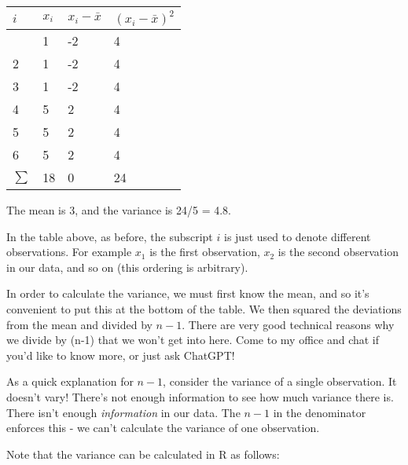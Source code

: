 \documentclass[
  letterpaper,
  DIV=11,
  numbers=noendperiod]{scrreprt}
\begin{document}
\begin{longtable}[]{@{}llll@{}}
\toprule\noalign{}
\(i\) & \(x_i\) & \(x_i - \bar x\) & \((x_i - \bar x)^2\) \\
\midrule\noalign{}
\endhead
\bottomrule\noalign{}
\endlastfoot
1 & 1 & -2 & 4 \\
2 & 1 & -2 & 4 \\
3 & 1 & -2 & 4 \\
4 & 5 & 2 & 4 \\
5 & 5 & 2 & 4 \\
6 & 5 & 2 & 4 \\
\(\sum\) & 18 & 0 & 24 \\
\end{longtable}

The mean is 3, and the variance is 24/5 = 4.8.

In the table above, as before, the subscript \(i\) is just used to
denote different observations. For example \(x_1\) is the first
observation, \(x_2\) is the second observation in our data, and so on
(this ordering is arbitrary).

In order to calculate the variance, we must first know the mean, and so
it's convenient to put this at the bottom of the table. We then squared
the deviations from the mean and divided by \(n-1\). There are very good
technical reasons why we divide by (n-1) that we won't get into here.
Come to my office and chat if you'd like to know more, or just ask
ChatGPT!

\begin{tcolorbox}[enhanced jigsaw, toptitle=1mm, colbacktitle=quarto-callout-note-color!10!white, breakable, leftrule=.75mm, left=2mm, opacityback=0, colframe=quarto-callout-note-color-frame, rightrule=.15mm, toprule=.15mm, bottomtitle=1mm, titlerule=0mm, title=\textcolor{quarto-callout-note-color}{\faInfo}\hspace{0.5em}{\(n-1\) in the denominator}, arc=.35mm, colback=white, bottomrule=.15mm, opacitybacktitle=0.6, coltitle=black]

As a quick explanation for \(n-1\), consider the variance of a single
observation. It doesn't vary! There's not enough information to see how
much variance there is. There isn't enough \emph{information} in our
data. The \(n-1\) in the denominator enforces this - we can't calculate
the variance of one observation.

\end{tcolorbox}

Note that the variance can be calculated in R as follows:
\end{document}
